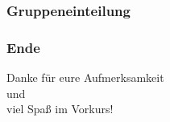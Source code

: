 \documentclass{beamer}
\begin{document}
{
	
	
	
	
	
}

\begin{frame}
\frametitle{Gruppeneinteilung}
\end{frame}

\begin{frame}
\frametitle{Ende}
\begin{center}
Danke für eure Aufmerksamkeit\\
und\\
viel Spaß im Vorkurs!
\end{center}
\end{frame}
\end{document}
